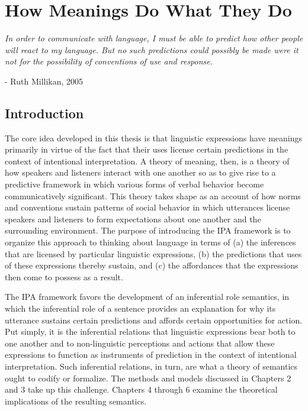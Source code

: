 
\chapter{How Meanings Do What They Do}
\renewcommand{\epigraphrule}{0pt}
\setlength{\epigraphwidth}{4.5in}
\epigraph{\textit{In order to communicate with language, I must be able to predict how other people will react to my language. But no such predictions could possibly be made were it not for the possibility of conventions of use and response.}}{- Ruth Millikan, 2005}

\section{Introduction}

The core idea developed in this thesis is that linguistic expressions have meanings primarily in virtue of the fact that their uses license certain predictions in the context of intentional interpretation. A theory of meaning, then, is a theory of how speakers and listeners interact with one another so as to give rise to a predictive framework in which various forms of verbal behavior become communicatively significant. This theory takes shape as an account of how norms and conventions sustain patterns of social behavior in which utterances license speakers and listeners to form expectations about one another and the surrounding environment. The purpose of introducing the IPA framework is to organize this approach to thinking about language in terms of (a) the inferences that are licensed by particular linguistic expressions, (b) the predictions that uses of these expressions thereby sustain, and (c) the affordances that the expressions then come to possess as a result.

The IPA framework favors the development of an inferential role semantics, in which the inferential role of a sentence provides an explanation for why its utterance sustains certain predictions and affords certain opportunities for action. Put simply, it is the inferential relations that linguistic expressions bear both to one another and to non-linguistic perceptions and actions that allow these expressions to function as instruments of prediction in the context of intentional interpretation. Such inferential relations, in turn, are what a theory of semantics ought to codify or formalize. The methods and models discussed in Chapters 2 and 3 take up this challenge. Chapters 4 through 6 examine the theoretical implications of the resulting semantics. 

